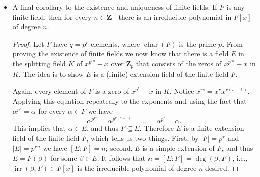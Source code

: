 \documentclass[11pt]{article}
\newcommand{\Z}{\mathbf{Z}}
\newcommand{\la}{\langle}
\newcommand{\ra}{\rangle}
\newcommand{\abs}[1]{\lvert #1 \rvert}
\newcommand{\kar}{\operatorname{char}}
\newcommand{\irr}{\operatorname{irr}}
\begin{document}
\begin{itemize}
\begin{itemize}
        (Proof 2, from Fraleigh, without splitting field) We want to show that for $E$ and $E'$ of order $p^n$, $E \simeq E'$.
        
        Since $E$ is a finite extension of $\Z_p$ with order $p^n$, it is a simple extension of degree $n$ over $\Z_p$. Thus for some $\alpha 
        \in E$ we have $f(x) \coloneqq \irr(\alpha,\Z_p) \in \Z_p[x]$ of degree $n$ such that $E \simeq \Z_p[x]/\la f(x) \ra$. Since the elements of $E$ are zeros of $x^{p^n}-x$ in some splitting field $K$ of it over $\Z_p$, $f(x) = \irr(\alpha,\Z_p)$ must divide $x^{p^n} - x$.
        
        Because $E'$ also consists of zeros of $x^{p^n}-x$ in some splitting field $K'$ of it over $\Z_p$, $E'$ must contain the zeros of $f(x)$ over $K'$ because $f(x) \mid (x^{p^n}-x)$. Let $\alpha' \in E'$ be such a zero of the irreducible $f(x)$. It follows that $f(x) = \irr(\alpha',\Z_p)$, which implies that $E \simeq \Z_p[x]/\la f(x) \ra \simeq \Z_p(\alpha') \subseteq E'$. Yet $E$ and $E'$ are of the same order $p^n$, so $E \simeq E'$, as desired.
    \end{itemize}
    \item A final corollary to the existence and uniqueness of finite fields: If $F$ is any finite field, then for every $n \in \Z^+$ there is an irreducible polynomial in $F[x]$ of degree $n$.
        \begin{proof}
            Let $F$ have $q = p^r$ elements, where $\kar(F)$ is the prime $p$. From proving the existence of finite fields we now know that there is a field $E$ in the splitting field $K$ of $x^{p^{rn}}-x$ over $\Z_p$ that consists of the zeros of $x^{p^{rn}}-x$ in $K$. The idea is to show $E$ is a (finite) extension field of the finite field $F$.

            Again, every element of $F$ is a zero of $x^{p^r}-x$ in $K$. Notice $x^{rs} = x^r x^{r(s-1)}$. Applying this equation repeatedly to the exponents and using the fact that $\alpha^{p^r} = \alpha$ for every $\alpha \in F$ we have \[\alpha^{p^{rn}} = \alpha^{p^{r(n-1)}} = \dots = \alpha^{p^r} = \alpha.\] This implies that $\alpha \in E$, and thus $F \subseteq E$. Therefore $E$ is a finite extension field of the finite field $F$, which tells us two things. First, by $\abs{F} = p^r$ and $\abs{E} = p^{rn}$ we have $[E:F] = n$; second, $E$ is a simple extension of $F$, and thus $E = F(\beta)$ for some $\beta \in E$. It follows that $n = [E:F] = \deg(\beta,F)$, i.e., $\irr(\beta,F) \in F[x]$ is the irreducible polynomial of degree $n$ desired.
        \end{proof}
\end{itemize}
\end{document}
